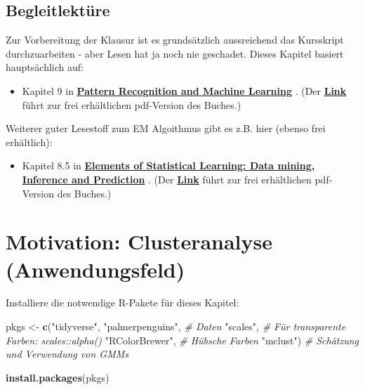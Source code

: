 \documentclass[
]{book}
\newenvironment{Shaded}{\begin{snugshade}}{\end{snugshade}}
\newcommand{\CommentTok}[1]{\textcolor[rgb]{0.56,0.35,0.01}{\textit{#1}}}
\newcommand{\KeywordTok}[1]{\textcolor[rgb]{0.13,0.29,0.53}{\textbf{#1}}}
\newcommand{\NormalTok}[1]{#1}
\newcommand{\StringTok}[1]{\textcolor[rgb]{0.31,0.60,0.02}{#1}}
\providecommand{\tightlist}{%
  \setlength{\itemsep}{0pt}\setlength{\parskip}{0pt}}
\begin{document}
\hypertarget{begleitlektuxfcre}{%
\subsection*{Begleitlektüre}\label{begleitlektuxfcre}}

Zur Vorbereitung der Klausur ist es grundsätzlich aussreichend das Kursskript durchzuarbeiten - aber Lesen hat ja noch nie geschadet. Dieses Kapitel basiert hauptsächlich auf:

\begin{itemize}
\tightlist
\item
  Kapitel 9 in \href{https://www.microsoft.com/en-us/research/uploads/prod/2006/01/Bishop-Pattern-Recognition-and-Machine-Learning-2006.pdf}{\textbf{Pattern Recognition and Machine Learning}} \citep{book_Bishop2006}. (Der \href{https://www.microsoft.com/en-us/research/uploads/prod/2006/01/Bishop-Pattern-Recognition-and-Machine-Learning-2006.pdf}{\textbf{Link}} führt zur frei erhältlichen pdf-Version des Buches.)
\end{itemize}

Weiterer guter Lesestoff zum EM Algoithmus gibt es z.B. hier (ebenso frei erhältlich):

\begin{itemize}
\tightlist
\item
  Kapitel 8.5 in \href{https://web.stanford.edu/~hastie/ElemStatLearn/}{\textbf{Elements of Statistical Learning: Data mining, Inference and Prediction}} \citep{Elements}. (Der \href{https://web.stanford.edu/~hastie/ElemStatLearn/}{\textbf{Link}} führt zur frei erhältlichen pdf-Version des Buches.)
\end{itemize}

\hypertarget{motivation-clusteranalyse-anwendungsfeld}{%
\section{Motivation: Clusteranalyse (Anwendungsfeld)}\label{motivation-clusteranalyse-anwendungsfeld}}

Installiere die notwendige R-Pakete für dieses Kapitel:

\begin{Shaded}
\begin{Highlighting}[]
\NormalTok{pkgs <-}\StringTok{ }\KeywordTok{c}\NormalTok{(}\StringTok{"tidyverse"}\NormalTok{, }
          \StringTok{"palmerpenguins"}\NormalTok{, }\CommentTok{# Daten}
          \StringTok{"scales"}\NormalTok{,         }\CommentTok{# Für transparente Farben: scales::alpha()}
          \StringTok{"RColorBrewer"}\NormalTok{,   }\CommentTok{# Hübsche Farben}
          \StringTok{"mclust"}\NormalTok{)         }\CommentTok{# Schätzung und Verwendung von GMMs}

\KeywordTok{install.packages}\NormalTok{(pkgs)}
\end{Highlighting}
\end{Shaded}
\end{document}
